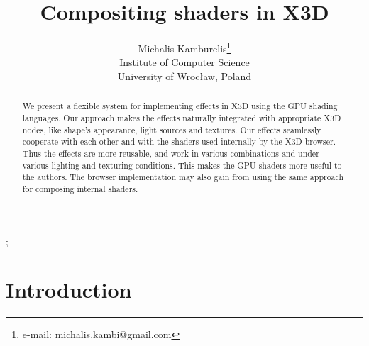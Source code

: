 \documentclass{acmsiggraph}                     %
\title{Compositing shaders in X3D}
\author{Michalis Kamburelis\thanks{e-mail: michalis.kambi@gmail.com}\\Institute of Computer Science\\University of Wroc{\l}aw, Poland}
\begin{document}

\maketitle

\begin{abstract}
We present a flexible system for implementing effects in X3D
using the GPU shading languages.
Our approach makes the effects naturally integrated with appropriate
X3D nodes, like shape's appearance, light sources and textures.
Our effects seamlessly cooperate with each other and with
the shaders used internally by the X3D browser.
Thus the effects are more reusable, and work in various combinations
and under various lighting and texturing conditions.
This makes the GPU shaders more useful to the authors.
The browser implementation may also gain from using the same approach
for composing internal shaders.
\end{abstract}

\begin{CRcatlist}
  ;
\end{CRcatlist}

\keywordlist

\section{Introduction}

\copyrightspace
\end{document}
